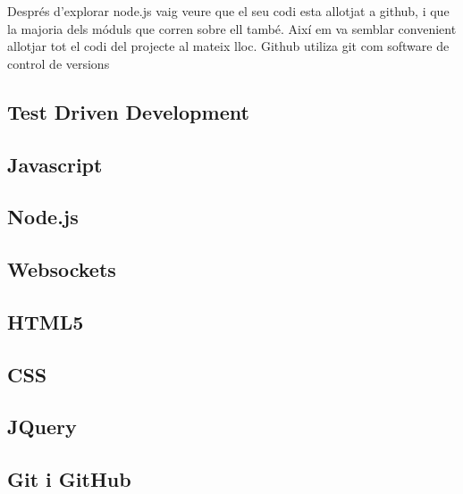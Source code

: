 Després d'explorar node.js vaig veure que el seu codi esta allotjat a github, i que la majoria dels móduls que corren sobre ell també. Així em va semblar convenient allotjar tot el codi del projecte al mateix lloc. Github utiliza git com software de control de versions

\subsection{Test Driven Development}

\subsection{Javascript}

\subsection{Node.js}

\subsection{Websockets}

\subsection{HTML5}

\subsection{CSS}

\subsection{JQuery}

\subsection{Git i GitHub}


